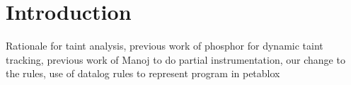 \chapter{Introduction}
Rationale for taint analysis, previous work of phosphor for dynamic taint tracking, previous work of Manoj to do partial instrumentation, our change to the rules, use of datalog rules to represent program in petablox
